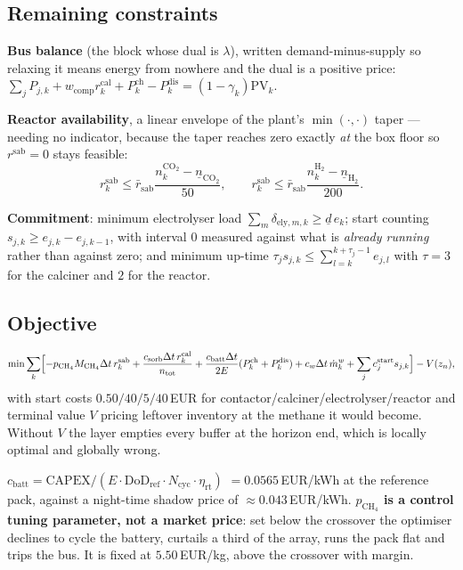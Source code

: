 \documentclass[11pt,a4paper]{article}
\begin{document}
\subsection{Remaining constraints}

\textbf{Bus balance} (the block whose dual is $\lambda$), written
demand-minus-supply so relaxing it means energy from nowhere and the dual is a
positive price:
$\sum_j P_{j,k} + w_{\text{comp}} r^{\text{cal}}_k + P^{\text{ch}}_k - P^{\text{dis}}_k = (1-\gamma_k)\mathrm{PV}_k$.

\textbf{Reactor availability}, a linear envelope of the plant's $\min(\cdot,\cdot)$
taper --- needing no indicator, because the taper reaches zero exactly \emph{at}
the box floor so $r^{\text{sab}}=0$ stays feasible:
\begin{equation}
r^{\text{sab}}_k \le \bar r_{\text{sab}}\frac{n^{\mathrm{CO_2}}_k-\underline n_{\mathrm{CO_2}}}{50},
\qquad
r^{\text{sab}}_k \le \bar r_{\text{sab}}\frac{n^{\mathrm{H_2}}_k-\underline n_{\mathrm{H_2}}}{200}.
\end{equation}

\textbf{Commitment}: minimum electrolyser load
$\sum_m \delta_{\text{ely},m,k}\ge \underline d\,e_k$; start counting
$s_{j,k}\ge e_{j,k}-e_{j,k-1}$, with interval 0 measured against what is
\emph{already running} rather than against zero; and minimum up-time
$\tau_j s_{j,k}\le\sum_{l=k}^{k+\tau_j-1}e_{j,l}$ with $\tau=3$ for the calciner
and $2$ for the reactor.

\subsection{Objective}

\begin{equation}
\min \sum_{k}\Bigl[-p_{\mathrm{CH_4}}M_{\mathrm{CH_4}}\Delta t\,r^{\text{sab}}_k
+ \frac{c_{\text{sorb}}\Delta t\,r^{\text{cal}}_k}{n_{\text{tot}}}
+ \frac{c_{\text{batt}}\Delta t}{2E}(P^{\text{ch}}_k+P^{\text{dis}}_k)
+ c_w\Delta t\,\dot m^w_k
+ \sum_j c^{\text{start}}_j s_{j,k}\Bigr] - V(z_n),
\end{equation}
with start costs $0.50/40/5/40$\,EUR for contactor/calciner/electrolyser/reactor
and terminal value $V$ pricing leftover inventory at the methane it would become.
Without $V$ the layer empties every buffer at the horizon end, which is locally
optimal and globally wrong.

$c_{\text{batt}} = \mathrm{CAPEX}/(E\cdot\mathrm{DoD}_{\text{ref}}\cdot N_{\text{cyc}}\cdot\eta_{\text{rt}})$
$= 0.0565$\,EUR/kWh at the reference pack, against a night-time shadow price of
${\approx}0.043$\,EUR/kWh. \textbf{$p_{\mathrm{CH_4}}$ is a control tuning
parameter, not a market price}: set below the crossover the optimiser declines
to cycle the battery, curtails a third of the array, runs the pack flat and trips
the bus. It is fixed at $5.50$\,EUR/kg, above the crossover with margin.
\end{document}
